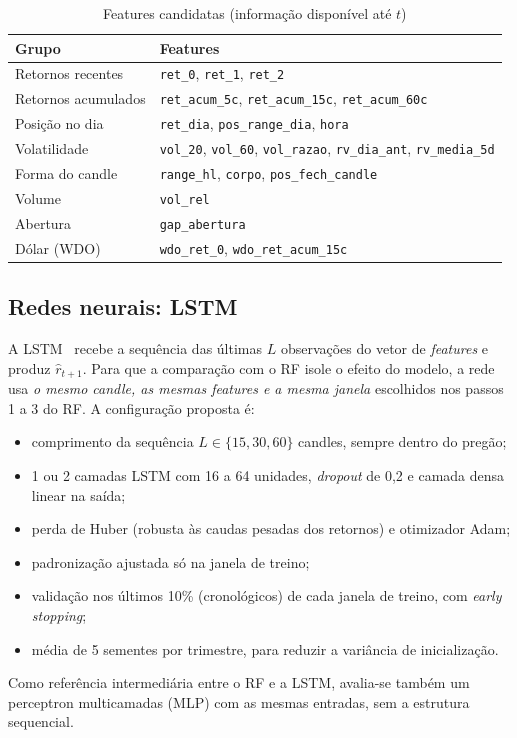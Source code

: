 \documentclass[conference]{IEEEtran}
\begin{document}
\begin{table}[!t]
\centering
\caption{Features candidatas (informação disponível até $t$)}
\label{tab:features}
\footnotesize
\begin{tabular}{@{}p{}p{}@{}}
\toprule
Grupo & Features \\
\midrule
Retornos recentes   & \texttt{ret\_0}, \texttt{ret\_1}, \texttt{ret\_2} \\
Retornos acumulados & \texttt{ret\_acum\_5c}, \texttt{ret\_acum\_15c}, \texttt{ret\_acum\_60c} \\
Posição no dia      & \texttt{ret\_dia}, \texttt{pos\_range\_dia}, \texttt{hora} \\
Volatilidade        & \texttt{vol\_20}, \texttt{vol\_60}, \texttt{vol\_razao}, \texttt{rv\_dia\_ant}, \texttt{rv\_media\_5d} \\
Forma do candle     & \texttt{range\_hl}, \texttt{corpo}, \texttt{pos\_fech\_candle} \\
Volume              & \texttt{vol\_rel} \\
Abertura            & \texttt{gap\_abertura} \\
Dólar (WDO)         & \texttt{wdo\_ret\_0}, \texttt{wdo\_ret\_acum\_15c} \\
\bottomrule
\end{tabular}
\end{table}

\subsection{Redes neurais: LSTM}

A LSTM~\cite{hochreiter1997} recebe a sequência das últimas $L$ observações do vetor de \emph{features} e produz $\hat r_{t+1}$. Para que a comparação com o RF isole o efeito do modelo, a rede usa \emph{o mesmo candle, as mesmas features e a mesma janela} escolhidos nos passos 1 a 3 do RF. A configuração proposta é:
\begin{itemize}
  \item comprimento da sequência $L \in \{15, 30, 60\}$ candles, sempre dentro do pregão;
  \item 1 ou 2 camadas LSTM com 16 a 64 unidades, \emph{dropout} de 0,2 e camada densa linear na saída;
  \item perda de Huber (robusta às caudas pesadas dos retornos) e otimizador Adam;
  \item padronização ajustada só na janela de treino;
  \item validação nos últimos 10\% (cronológicos) de cada janela de treino, com \emph{early stopping};
  \item média de 5 sementes por trimestre, para reduzir a variância de inicialização.
\end{itemize}
Como referência intermediária entre o RF e a LSTM, avalia-se também um perceptron multicamadas (MLP) com as mesmas entradas, sem a estrutura sequencial.
\end{document}
